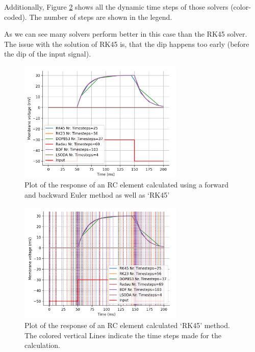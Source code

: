\documentclass{article}
\begin{document}
    Additionally, Figure \ref{fig:RC_all_solvers_with_timesteps} shows all the dynamic time steps of those solvers (color-coded).
    The number of steps are shown in the legend.

    \vspace{10pt}
    As we can see many solvers perform better in this case than the RK45 solver.
    The issue with the solution of RK45 is, that the dip happens too early (before the dip of the input signal).

    \begin{figure}[h!]
        \centering
        \includegraphics[width=0.7\textwidth]{RC_all_solvers.png}
        \caption{Plot of the response of an RC element calculated using a forward and backward Euler method as well as ‘RK45’}
        \label{fig:RC_all_solvers}
    \end{figure}
    \begin{figure}[h!]
        \centering
        \includegraphics[width=0.7\textwidth]{RC_all_solvers_with_timesteps.png}
        \caption{Plot of the response of an RC element calculated ‘RK45’ method. The colored vertical Lines indicate the time steps made for the calculation.}
        \label{fig:RC_all_solvers_with_timesteps}
    \end{figure}
\end{document}
